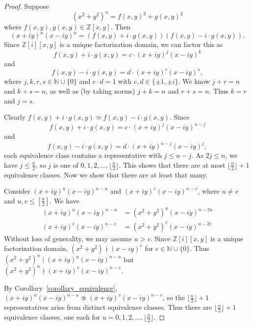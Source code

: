 \documentclass[12pt]{article}
\theoremstyle{definition}
\newcommand{\divides}{\mid}
\newcommand{\notdivides}{\nmid}
\numberwithin{equation}{section}
\begin{document}
\begin{proof}
Suppose 
\[ (x^2 + y^2)^n = f(x,y)^2 + g(x,y)^2 \]
where \( f(x,y), g(x,y) \in \mathbb{Z}[x,y] \).
Then  
\[ (x + iy)^n (x -  iy)^n = ( f(x,y) + i \cdot g(x,y) ) ( f(x,y) - i \cdot g(x,y) ) .\]
Since \( \mathbb{Z} [i][x,y] \) is a unique factorization domain,
we can factor this as
\[ f(x,y) + i \cdot g(x,y) = c \cdot (x + iy)^j (x -  iy)^k \]
and
\[ f(x,y) - i \cdot g(x,y) = d \cdot (x + iy)^r (x -  iy)^s,\]
where \( j, k, r, s \in \mathbb{N} \cup \{0\} \) and
\(c \cdot d = 1 \) with \( c,d \in \{ \pm 1 , \pm i \} \). 
We know \( j + r = n \) and \( k + s = n \), as well as
(by taking norms) \( j + k = n \) and \( r + s = n \).
Thus \(k = r\) and \(j = s\).

Clearly \( f(x,y) + i \cdot g(x,y) \simeq  f(x,y) - i \cdot g(x,y) \).
Since 
\[ 
f(x,y) + i \cdot g(x,y) = c \cdot (x + iy)^j (x -  iy)^{n-j} 
\]
and 
\[ 
f(x,y) - i \cdot g(x,y) = d \cdot (x + iy)^{n-j} (x -  iy)^j,
\]
each equivalence class contains a representative with \( j \leq n - j
\).  As \( 2j \leq n \), we have \( j \leq \frac{n}{2} \), so \( j \)
is one of \( 0, 1, 2, \ldots, \lfloor \frac{n}{2} \rfloor \). This shows
that there are at most \( \lfloor \frac{n}{2} \rfloor + 1 \)
equivalence classes. Now we show that there are at least that many.



Consider \( (x + iy)^u (x -  iy)^{n-u} \)  and \( (x + iy)^v (x -  iy)^{n-v} \),
where \( u \neq v \) and \(u,v \leq [ \frac{n}{2} ] \). We have
\begin{align*}
(x + iy)^u (x -  iy)^{n-u} &= (x^2 + y^2)^u (x -  iy)^{n-2u}
\\
(x + iy)^v (x -  iy)^{n-v} &= (x^2 + y^2)^v (x -  iy)^{n-2v}
\end{align*}
Without loss of generality, we may assume \( u > v \). 
Since \( \mathbb{Z} [i][x,y] \) is a unique factorization domain,
\( (x^2 + y^2) \notdivides (x -  iy)^e \) for \( e \in \mathbb{N} \cup \{ 0 \} \).
Thus \( (x^2 + y^2)^u \divides (x + iy)^u (x -  iy)^{n-u} \)
but \( (x^2 + y^2)^u \notdivides (x + iy)^v (x -  iy)^{n-v} \).

By Corollary~\ref{corollary_equivalence},
\( (x + iy)^u (x -  iy)^{n-u} \not\simeq (x + iy)^v (x -  iy)^{n-v} \), 
so the \( \lfloor \frac{n}{2} \rfloor + 1 \) representatives arise from
distinct equivalence classes.
Thus there are \( \lfloor \frac{n}{2} \rfloor + 1 \) equivalence classes, 
one each for \( u = 0, 1, 2, \ldots,  \lfloor \frac{n}{2} \rfloor \).
\end{proof}
\end{document}
